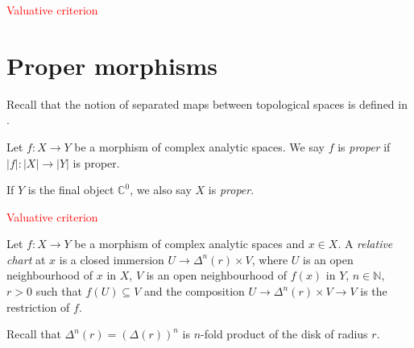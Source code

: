 \textcolor{red}{Valuative criterion}

\section{Proper morphisms}

Recall that the notion of separated maps between topological spaces is defined in \cite[\href{https://stacks.math.columbia.edu/tag/01W1}{Tag 01W1}]{stacks-project}.

\begin{definition}
    Let $f:X\rightarrow Y$ be a morphism of complex analytic spaces. We say $f$ is \emph{proper} if $|f|:|X|\rightarrow |Y|$ is proper.

    If $Y$ is the final object $\mathbb{C}^0$, we also say $X$ is \emph{proper}.
\end{definition}

\textcolor{red}{Valuative criterion}


\begin{definition}
    Let $f:X\rightarrow Y$ be a morphism of complex analytic spaces and $x\in X$. A \emph{relative chart} at $x$ is a closed immersion $U\rightarrow \Delta^n(r)\times V$, where $U$ is an open neighbourhood of $x$ in $X$, $V$ is an open neighbourhood of $f(x)$ in $Y$, $n\in \mathbb{N}$, $r>0$ such that $f(U)\subseteq V$ and the composition $U\rightarrow \Delta^n(r)\times V\rightarrow V$ is the restriction of $f$. 
\end{definition}
Recall that $\Delta^n(r)=(\Delta(r))^n$ is $n$-fold product of the disk of radius $r$.

\printbibliography












\iffalse

